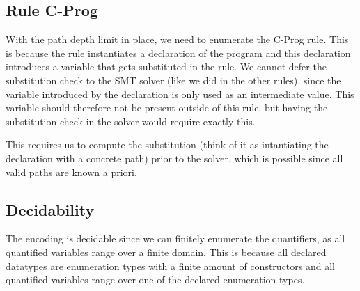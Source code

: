 \documentclass[a4paper]{article}
\begin{document}
\subsection{Rule C-Prog}
With the path depth limit in place, we need to enumerate the C-Prog rule.
This is because the rule instantiates a declaration of the program
and this declaration introduces a variable that gets substituted in the rule.
We cannot defer the substitution check to the SMT solver (like we did in the other rules),
since the variable introduced by the declaration is only used as an intermediate value.
This variable should therefore not be present outside of this rule,
but having the substitution check in the solver would require exactly this.

This requires us to compute the substitution (think of it as intantiating the declaration with a concrete path)
prior to the solver, which is possible since all valid paths are known a priori.


\subsection{Decidability}
\label{sec:smt-depth-limit-decidability}
The encoding is decidable since we can finitely enumerate the quantifiers,
as all quantified variables range over a finite domain.
This is because all declared datatypes are enumeration types
with a finite amount of constructors and all quantified variables
range over one of the declared enumeration types.
\end{document}
